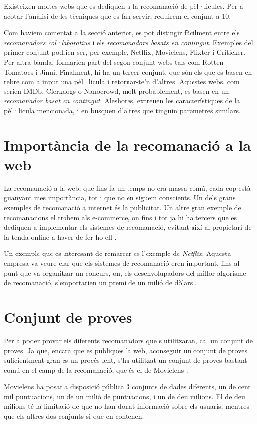 Existeixen moltes webs que es dediquen a la recomanació de pèl·licules. Per a acotar l'anàlisi de les tècniques que es fan servir, reduirem el conjunt a 10.\cite{top-ten-film-recommenders}

Com haviem comentat a la secció anterior, es pot distingir fàcilment entre els \emph{recomanadors col·laboratius} i els \emph{recomanadors basats en contingut}. Exemples del primer conjunt podrien ser, per exemple, Netflix, Movielens, Flixter i Criticker. Per altra banda, formarien part del segon conjunt webs tals com Rotten Tomatoes i Jinni. Finalment, hi ha un tercer conjunt, que són els que es basen en rebre com a input una pèl·licula i retornar-te'n d'altres. Aquestes webs, com serien IMDb, Clerkdogs o Nanocrowd, molt probablement, es basen en un \emph{recomanador basat en contingut}. Aleshores, extreuen les característiques de la pèl·licula mencionada, i en busquen d'altres que tinguin parametres similars.

\section{Importància de la recomanació a la web}

La recomanació a la web, que fins fa un temps no era massa comú, cada cop està guanyant mes importància, tot i que no en siguem conscients. Un dels grans exemples de recomanació a internet és la publicitat. Un altre gran exemple de recomanacions el trobem als e-commerce, on fins i tot ja hi ha tercers que es dediquen a implementar els sistemes de recomanació, evitant així al propietari de la tenda online a haver de fer-ho ell \cite{brainsins}.

Un exemple que es interesant de remarcar es l'exemple de \emph{Netflix}. Aquesta empresa va veure clar que els sistemes de recomanació eren important, fins al punt que va organitzar un concurs, on, els desenvolupadors del millor algorisme de recomanació, s'emportarien un premi de un milió de dòlars \cite{netflix-prize}.

\section{Conjunt de proves}

Per a poder provar els diferents recomanadors que s'utilitzaran, cal un conjunt de proves. Ja que, encara que es publiques la web, aconseguir un conjunt de proves suficientment gran és un procés lent, s'ha utilitzat un conjunt de proves bastant comú en el camp de la recomanació, que és el de Movielens \cite{movielens-dataset}.

Movielens ha posat a disposició pública 3 conjunts de dades diferents, un de cent mil puntuacions, un de un milió de puntuacions, i un de deu milions. El de deu milions té la limitació de que no han donat informació sobre els usuaris, mentres que els altres dos conjunts si que en contenen.